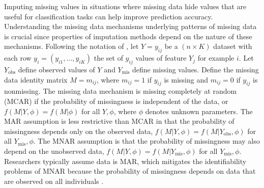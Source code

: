 \documentclass[10pt]{book}
\theoremstyle{definition}
\begin{document}
Imputing missing values in situations where missing data hide values that are useful for classification tasks can help improve prediction accuracy. Understanding the missing data mechanisms underlying patterns of missing data is crucial since properties of imputation methods depend on the nature of these mechanisms. Following the notation of \cite[Chap.~1]{little2014}, let $Y = y_{ij}$ be a $(n \times K)$ dataset with each row $y_i = (y_{i1}, \ldots, y_{iK})$ the set of $y_{ij}$ values of feature $Y_j$ for example $i$. Let $Y_{\mathrm{obs}}$ define observed values of $Y$ and $Y_{\mathrm{mis}}$ define missing values. Define the missing data identity matrix $M = m_{ij}$, where $m_{ij} = 1$ if $y_{ij}$ is missing and $m_{ij} = 0$ if $y_{ij}$ is nonmissing. The missing data mechanism is missing completely at random (MCAR) if the probability of missingness is independent of the data, or $f(M | Y, \phi) = f(M | \phi)$ for all $Y, \phi$, where $\phi$ denotes unknown parameters. The MAR assumption is less restrictive than MCAR in that the probability of missingness depends only on the observed data, $f(M | Y, \phi) = f(M | Y_{\mathrm{obs}}, \phi)$ for all $Y_{\mathrm{mis}}, \phi$. The MNAR assumption is that the probability of missingness may also depend on the unobserved data, $f(M | Y, \phi) = f(M | Y_{\mathrm{mis}}, \phi)$ for all $Y_{\mathrm{mis}}, \phi$. Researchers typically assume data is MAR, which mitigates the identifiability problems of MNAR because the probability of missingness depends on data that are observed on all individuals \citep[Chap.~6]{tsiatis2007}. 

\par			
{} \label{section:techniques} 
\end{document}

